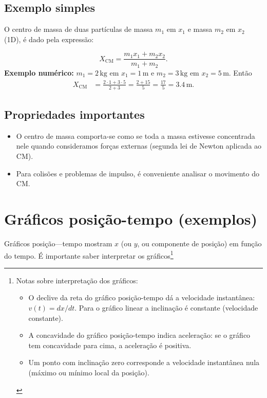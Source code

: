\documentclass[a4paper,12pt]{article}
\begin{document}
	\subsection{Exemplo simples}
	O centro de massa de duas partículas de massa $m_1$ em $x_1$ e massa $m_2$ em $x_2$ (1D), é dado pela expressão:
	 
	\[ X_{\mathrm{CM}} = \frac{m_1 x_1 + m_2 x_2}{m_1+m_2}. \]
	\textbf{Exemplo numérico:} $m_1=2\,\mathrm{kg}$ em $x_1=1\,\mathrm{m}$ e $m_2=3\,\mathrm{kg}$ em $x_2=5\,\mathrm{m}$. Então
	\begin{align*}
		X_{\mathrm{CM}} &= \frac{2\cdot 1 + 3\cdot 5}{2+3} = \frac{2+15}{5} = \frac{17}{5} = 3.4\,\mathrm{m}.
	\end{align*}
	
	\subsection{Propriedades importantes}
	\begin{itemize}
		\item O centro de massa comporta-se como se toda a massa estivesse concentrada nele quando consideramos forças externas (segunda lei de Newton aplicada ao CM).
		\item Para colisões e problemas de impulso, é conveniente analisar o movimento do CM.
	\end{itemize}
	
	\section{Gráficos posição-tempo (exemplos)}
	Gráficos posição---tempo mostram $x$ (ou $y$, ou componente de posição) em função do tempo. É importante saber interpretar os gráficos\footnote{
	Notas sobre interpretação dos gráficos:\\
	\begin{itemize}
		\item O declive da reta do gráfico posição-tempo dá a velocidade instantânea: $v(t)=dx/dt$. Para o gráfico linear a inclinação é constante (velocidade constante).
		\item A concavidade do gráfico posição-tempo indica aceleração: se o gráfico tem concavidade para cima, a aceleração é positiva.
		\item Um ponto com inclinação zero corresponde a velocidade instantânea nula (máximo ou mínimo local da posição).
	\end{itemize}
	}
	
\end{document}
